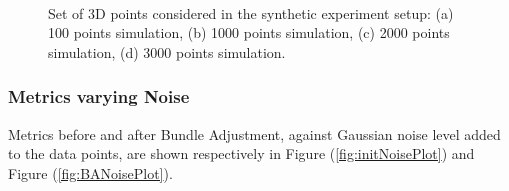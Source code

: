 \begin{figure}[h]
    \centering
    \\ 
    \caption[Synthetic Scene Setup]{Set of 3D points considered in the synthetic experiment setup: (a) 100 points simulation, (b) 1000 points simulation, (c) 2000 points simulation, (d) 3000 points simulation.}
    \label{fig:syntheticScenes}
\end{figure}

\pagebreak

\subsubsection*{Metrics varying Noise}
Metrics before and after Bundle Adjustment, against Gaussian noise level added to the data points, are shown respectively in Figure (\ref{fig:initNoisePlot}) and Figure (\ref{fig:BANoisePlot}).

